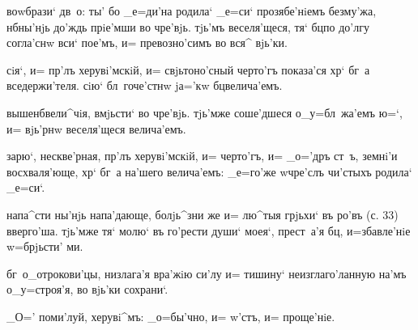 воwбрази` дв~о: ты' бо _е=ди'на родила` _е=си` 
прозябе'нiемъ без\ъ му'жа, нб ны'нjь до'ждь прiе'мши 
во чре'вjь. тjь'мъ веселя'щеся, тя` бц по до'лгу 
согла'снw вси` пое'мъ, и= превозно'симъ во вся^ вjь'ки.


сiя`, и= пр'лъ херувi'мскiй, и= свjьтоно'сный 
черто'гъ показа'ся хр` бг~а вседержи'теля. сiю` 
бл~гоче'стнw jа='кw бц велича'емъ.

вышенб вели^чiя, вмjьсти` во чре'вjь. тjь'мже 
соше'дшеся о_у=бл~жа'емъ ю=`, и= вjь'рнw веселя'щеся 
велича'емъ.

зарю`, нескве'рная, пр'лъ херувi'мскiй, и= черто'гъ, 
и= _о='дръ ст~ъ, земнi'и восхваля'юще, хр` бг~а 
на'шего велича'емъ: _е=го'же w\т чре'слъ чи'стыхъ родила` 
_е=си`.

напа^сти ны'нjь напа'дающе, болjь^зни же и= лю^тыя 
грjьхи` въ ро'въ (с. 33) вверго'ша. тjь'мже тя` молю` въ 
го'рести души` моея`, прест~а'я бц, и=збавле'нiе 
w=брjьсти' ми.

бг~о_отрокови'цы, низлага'я вра'жiю си'лу и= тишину` 
неизглаго'ланную на'мъ о_у=строя'я, во вjь'ки сохрани`.

_О='%
поми'луй, %
херувi^мъ: %
_о=бы'чно, и= w'стъ, и= проще'нiе.%

